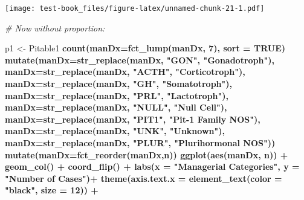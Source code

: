 \documentclass[]{book}
\newenvironment{Shaded}{\begin{snugshade}}{\end{snugshade}}
\newcommand{\CommentTok}[1]{\textcolor[rgb]{0.56,0.35,0.01}{\textit{#1}}}
\newcommand{\DataTypeTok}[1]{\textcolor[rgb]{0.13,0.29,0.53}{#1}}
\newcommand{\DecValTok}[1]{\textcolor[rgb]{0.00,0.00,0.81}{#1}}
\newcommand{\KeywordTok}[1]{\textcolor[rgb]{0.13,0.29,0.53}{\textbf{#1}}}
\newcommand{\NormalTok}[1]{#1}
\newcommand{\OperatorTok}[1]{\textcolor[rgb]{0.81,0.36,0.00}{\textbf{#1}}}
\newcommand{\OtherTok}[1]{\textcolor[rgb]{0.56,0.35,0.01}{#1}}
\newcommand{\StringTok}[1]{\textcolor[rgb]{0.31,0.60,0.02}{#1}}
\begin{document}
\texttt{[image: test-book\_files/figure-latex/unnamed-chunk-21-1.pdf]}

\begin{Shaded}
\begin{Highlighting}[]
\CommentTok{# Now without proportion:}

\NormalTok{p1 <-}\StringTok{ }\NormalTok{Pitable1 }\OperatorTok{%
\StringTok{  }\KeywordTok{count}\NormalTok{(}\DataTypeTok{manDx=}\KeywordTok{fct_lump}\NormalTok{(manDx, }\DecValTok{7}\NormalTok{), }\DataTypeTok{sort =} \OtherTok{TRUE}\NormalTok{) }\OperatorTok{%
\StringTok{  }\KeywordTok{mutate}\NormalTok{(}\DataTypeTok{manDx=}\KeywordTok{str_replace}\NormalTok{(manDx, }\StringTok{"GON"}\NormalTok{, }\StringTok{"Gonadotroph"}\NormalTok{),}
         \DataTypeTok{manDx=}\KeywordTok{str_replace}\NormalTok{(manDx, }\StringTok{"ACTH"}\NormalTok{, }\StringTok{"Corticotroph"}\NormalTok{),}
         \DataTypeTok{manDx=}\KeywordTok{str_replace}\NormalTok{(manDx, }\StringTok{"GH"}\NormalTok{, }\StringTok{"Somatotroph"}\NormalTok{),}
         \DataTypeTok{manDx=}\KeywordTok{str_replace}\NormalTok{(manDx, }\StringTok{"PRL"}\NormalTok{, }\StringTok{"Lactotroph"}\NormalTok{),}
         \DataTypeTok{manDx=}\KeywordTok{str_replace}\NormalTok{(manDx, }\StringTok{"NULL"}\NormalTok{, }\StringTok{"Null Cell"}\NormalTok{),}
         \DataTypeTok{manDx=}\KeywordTok{str_replace}\NormalTok{(manDx, }\StringTok{"PIT1"}\NormalTok{, }\StringTok{"Pit-1 Family NOS"}\NormalTok{),}
         \DataTypeTok{manDx=}\KeywordTok{str_replace}\NormalTok{(manDx, }\StringTok{"UNK"}\NormalTok{, }\StringTok{"Unknown"}\NormalTok{),}
         \DataTypeTok{manDx=}\KeywordTok{str_replace}\NormalTok{(manDx, }\StringTok{"PLUR"}\NormalTok{, }\StringTok{"Plurihormonal NOS"}\NormalTok{)) }\OperatorTok{%
\StringTok{  }\KeywordTok{mutate}\NormalTok{(}\DataTypeTok{manDx=}\KeywordTok{fct_reorder}\NormalTok{(manDx,n)) }\OperatorTok{%
\StringTok{  }\KeywordTok{ggplot}\NormalTok{(}\KeywordTok{aes}\NormalTok{(manDx, n)) }\OperatorTok{+}\StringTok{ }
\StringTok{  }\KeywordTok{geom_col}\NormalTok{() }\OperatorTok{+}\StringTok{ }
\StringTok{  }\KeywordTok{coord_flip}\NormalTok{() }\OperatorTok{+}\StringTok{ }
\StringTok{  }\KeywordTok{labs}\NormalTok{(}\DataTypeTok{x =} \StringTok{"Managerial Categories"}\NormalTok{, }
       \DataTypeTok{y =} \StringTok{"Number of Cases"}\NormalTok{)}\OperatorTok{+}
\StringTok{  }\KeywordTok{theme}\NormalTok{(}\DataTypeTok{axis.text.x =} \KeywordTok{element_text}\NormalTok{(}\DataTypeTok{color =} \StringTok{"black"}\NormalTok{, }\DataTypeTok{size =} \DecValTok{12}\NormalTok{)) }\OperatorTok{+}
}}}}
\end{Highlighting}
\end{Shaded}
\end{document}
